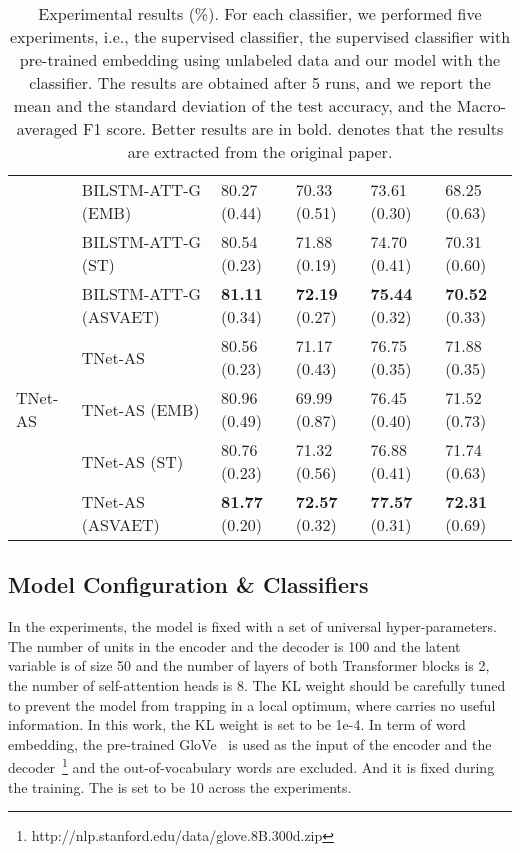 \documentclass[11pt,a4paper]{article}
\begin{document}
\begin{table*}
{\begin{tabular}{l l l l l l }
			& BILSTM-ATT-G (EMB) & 80.27 (0.44) & 70.33 (0.51) & 73.61 (0.30) & 68.25 (0.63) \\
			& BILSTM-ATT-G (ST) & 80.54 (0.23) & 71.88 (0.19) & 74.70 (0.41)  & 70.31 (0.60)\\
& BILSTM-ATT-G (ASVAET) & \textbf{81.11} (0.34) & \textbf{72.19} (0.27)  & \textbf{75.44} (0.32)  &  \textbf{70.52} (0.33)\\
			\hline
			\multirow{3}{*}{TNet-AS}
			& TNet-AS & 80.56 (0.23) & 71.17 (0.43) & 76.75 (0.35) & 71.88 (0.35) \\
			& TNet-AS (EMB) & 80.96 (0.49) & 69.99 (0.87) & 76.45 (0.40) & 71.52 (0.73) \\
			& TNet-AS (ST) & 80.76 (0.23) & 71.32 (0.56) & 76.88 (0.41)  & 71.74 (0.63)\\
			& TNet-AS (ASVAET) &\textbf{81.77} (0.20) & \textbf{72.57} (0.32) & \textbf{77.57} (0.31) & \textbf{72.31} (0.69) \\
			\hline
		\end{tabular}
	}
	\caption{Experimental results (\%). For each classifier, we performed five experiments, i.e., the supervised classifier, the supervised classifier with pre-trained embedding using unlabeled data and our model with the classifier. The results are obtained after 5 runs, and we report the mean and the standard deviation of the test accuracy, and the Macro-averaged F1 score. Better results are in bold.  denotes that the results are extracted from the original paper.}
	\label{tab:results}
\end{table*}



\subsection{Model Configuration \& Classifiers}
In the experiments, the model is fixed with a set of universal hyper-parameters.
The number of units in the encoder and the decoder is 100 and the latent variable is of size 50 and the number of layers of both Transformer blocks is 2, the number of self-attention heads is 8.
The KL weight  should be carefully tuned to prevent the model from trapping in a local optimum, where  carries no useful information.
In this work, the KL weight is set to be 1e-4.
In term of word embedding, the pre-trained GloVe~\cite{DBLP:conf/emnlp/PenningtonSM14} is used as the input of the encoder and the decoder~\footnote{http://nlp.stanford.edu/data/glove.8B.300d.zip} and the out-of-vocabulary words are excluded.
And it is fixed during the training.
The  is set to be 10 across the experiments.
\end{document}
